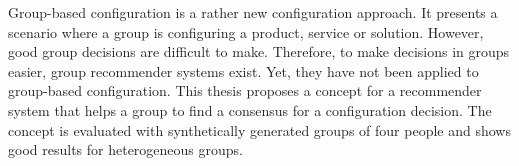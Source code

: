\Abstract

Group-based configuration is a rather new configuration approach. It presents a scenario where a group is configuring a product, service or solution. However, good group decisions are difficult to make. Therefore, to make decisions in groups easier, group recommender systems exist. Yet, they have not been applied to group-based configuration. This thesis proposes a concept for a recommender system that helps a group to find a consensus for a configuration decision. The concept is evaluated with synthetically generated groups of four people and shows good results for heterogeneous groups.